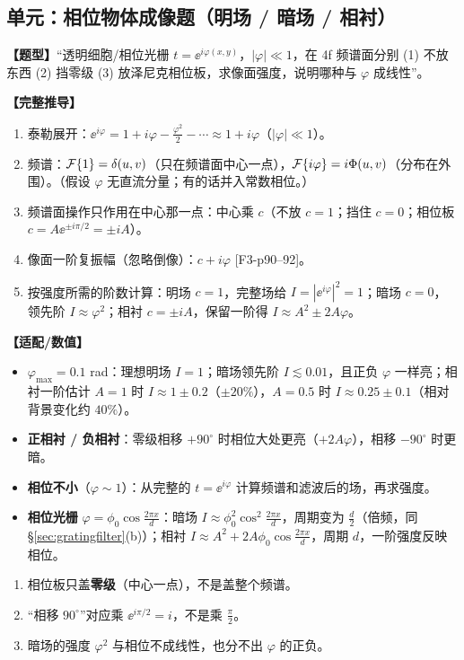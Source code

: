 \subsection*{单元：相位物体成像题（明场 / 暗场 / 相衬）}\label{sec:phasecontrast}

\textbf{【题型】}“透明细胞/相位光栅 $t=\ee^{i\varphi(x,y)}$，$|\varphi|\ll1$，在 4f 频谱面分别 (1) 不放东西 (2) 挡零级 (3) 放泽尼克相位板，求像面强度，说明哪种与 $\varphi$ 成线性”。

\textbf{【完整推导】}
\begin{enumerate}
\item 泰勒展开：$\ee^{i\varphi}=1+i\varphi-\frac{\varphi^2}2-\cdots\approx1+i\varphi$（$|\varphi|\ll1$）。
\item 频谱：$\mathcal{F}\{1\}=\delta(u,v)$（只在频谱面中心一点），$\mathcal{F}\{i\varphi\}=i\Phi(u,v)$（分布在外围）。（假设 $\varphi$ 无直流分量；有的话并入常数相位。）
\item 频谱面操作只作用在中心那一点：中心乘 $c$（不放 $c=1$；挡住 $c=0$；相位板 $c=A\ee^{\pm i\pi/2}=\pm iA$）。
\item 像面一阶复振幅（忽略倒像）：$c+i\varphi$ [F3-p90–92]。
\item 按强度所需的阶数计算：明场 $c=1$，完整场给 $I=|\ee^{i\varphi}|^2=1$；暗场 $c=0$，领先阶 $I\approx\varphi^2$；相衬 $c=\pm iA$，保留一阶得 $I\approx A^2\pm2A\varphi$。
\end{enumerate}

\textbf{【适配/数值】}
\begin{itemize}
\item $\varphi_{\max}=0.1$ rad：理想明场 $I=1$；暗场领先阶 $I\lesssim0.01$，且正负 $\varphi$ 一样亮；相衬一阶估计 $A=1$ 时 $I\approx1\pm0.2$（$\pm20\%$），$A=0.5$ 时 $I\approx0.25\pm0.1$（相对背景变化约 $40\%$）。
\item \textbf{正相衬 / 负相衬}：零级相移 $+90^\circ$ 时相位大处更亮（$+2A\varphi$），相移 $-90^\circ$ 时更暗。
\item \textbf{相位不小}（$\varphi\sim1$）：从完整的 $t=\ee^{i\varphi}$ 计算频谱和滤波后的场，再求强度。
\item \textbf{相位光栅} $\varphi=\phi_0\cos\frac{2\pi x}d$：暗场 $I\approx\phi_0^2\cos^2\frac{2\pi x}{d}$，周期变为 $\frac d2$（倍频，同 §\ref{sec:gratingfilter}(b)）；相衬 $I\approx A^2+2A\phi_0\cos\frac{2\pi x}d$，周期 $d$，一阶强度反映相位。
\end{itemize}

\begin{warn}[相衬题易错]
\begin{enumerate}
\item 相位板只盖\textbf{零级}（中心一点），不是盖整个频谱。
\item “相移 $90^\circ$”对应乘 $\ee^{i\pi/2}=i$，不是乘 $\frac\pi2$。
\item 暗场的强度 $\varphi^2$ 与相位不成线性，也分不出 $\varphi$ 的正负。
\end{enumerate}
\end{warn}
